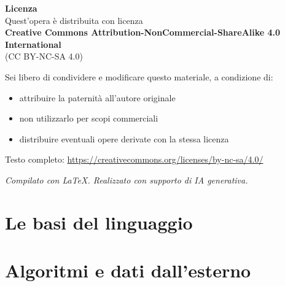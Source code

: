 \documentclass[a4paper,11pt,oneside]{book}
\begin{document}
\begin{tcolorbox}[
  enhanced,
  colback=white,
  colframe=black!40,
  boxrule=0.5pt,
  arc=3pt,
  left=10pt, right=10pt, top=8pt, bottom=8pt
]
\small
\textbf{Licenza}\\[4pt]
Quest'opera è distribuita con licenza\\
\textbf{Creative Commons Attribution-NonCommercial-ShareAlike 4.0 International}\\
(CC BY-NC-SA 4.0)

\medskip
Sei libero di condividere e modificare questo materiale, a condizione di:
\begin{itemize}[leftmargin=1.5em, itemsep=2pt, topsep=2pt]
  \item attribuire la paternità all'autore originale
  \item non utilizzarlo per scopi commerciali
  \item distribuire eventuali opere derivate con la stessa licenza
\end{itemize}

\smallskip
\noindent Testo completo: \url{https://creativecommons.org/licenses/by-nc-sa/4.0/}
\end{tcolorbox}

\vspace{1em}
\noindent\small\textit{Compilato con \LaTeX.
Realizzato con supporto di IA generativa.}

\clearpage

\tableofcontents
\clearpage

\part{Le basi del linguaggio}








\part{Algoritmi e dati dall'esterno}
\end{document}
